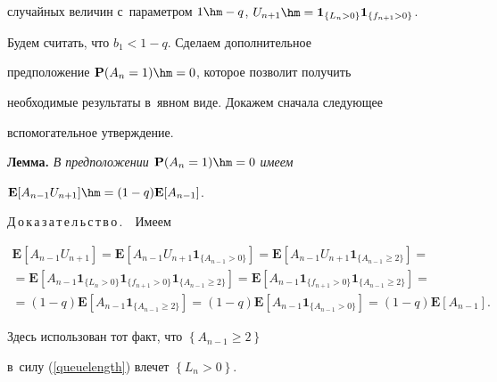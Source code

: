 случайных величин с~параметром $1\hm-q$, $U_{n+1}\hm

=\mathbf{1}_{\{L_n>0\}}\mathbf{1}_{\{f_{n+1}>0\}}$.



Будем считать, что $b_1<1-q$. Сделаем дополнительное

предположение $\mathbf{P}(A_n=1)\hm=0$, которое позволит получить

необходимые результаты в~явном виде. Докажем сначала следующее

вспомогательное утверждение.



\smallskip



\noindent

\textbf{Лемма.} \textit{В предположении $\mathbf{P}(A_n=1)\hm=0$ имеем}

$\mathbf{E}[A_{n-1}U_{n+1}]\hm=(1-q)\mathbf{E}[A_{n-1}]$.



\smallskip



\noindent

Д\,о\,к\,а\,з\,а\,т\,е\,л\,ь\,с\,т\,в\,о\,.\ \ Имеем

\begin{multline*}

\mathbf{E}\left[A_{n-1}U_{n+1}\right]=

\mathbf{E}\left[A_{n-1}U_{n+1}\mathbf{1}_{\{A_{n-1}>0\}}\right]=

\mathbf{E}\left[A_{n-1}U_{n+1}\mathbf{1}_{\{A_{n-1}\geq 2\}}\right]={}\\

{}=\mathbf{E}\left[A_{n-1}\mathbf{1}_{\{L_n>0\}}\mathbf{1}_{\{f_{n+1}>0\}}

\mathbf{1}_{\{A_{n-1}\geq 2\}}\right]=

\mathbf{E}\left[A_{n-1}\mathbf{1}_{\{f_{n+1}>0\}}\mathbf{1}_{\{A_{n-1}\geq 2\}}\right]={}\\

{}=(1-q)\mathbf{E}\left[A_{n-1}\mathbf{1}_{\{A_{n-1}\geq 2\}}\right]=

(1-q)\mathbf{E}\left[A_{n-1}\mathbf{1}_{\{A_{n-1}>0\}}\right]=

(1-q)\mathbf{E}[A_{n-1}].

\end{multline*}

Здесь использован тот факт, что $\left\{A_{n-1}\geq 2\right\}$

в~силу (\ref{queuelength}) влечет $\left\{L_n>0\right\}$.



